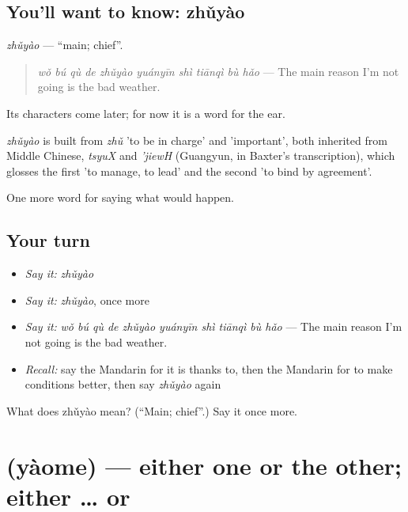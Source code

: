 \subsection*{You'll want to know: zhǔyào}
\emph{zhǔyào} — \textquotedblleft{}main; chief\textquotedblright{}.

\begin{quote}
\emph{wǒ bú qù de zhǔyào yuányīn shì tiānqì bù hǎo} — The main reason I'm not going is the bad weather.
\end{quote}

Its characters come later; for now it is a word for the ear.

\begin{cousinweb}
\emph{zhǔyào} is built from \emph{zhǔ} 'to be in charge' and  'important', both inherited from Middle Chinese, \emph{tsyuX} and \emph{'jiewH} (Guangyun, in Baxter's transcription), which glosses the first 'to manage, to lead' and the second 'to bind by agreement'.
\end{cousinweb}

\begin{grammarlens}[title={What you've built}]
One more word for saying what would happen.
\end{grammarlens}

\subsection*{Your turn}
\begin{itemize}
\raggedright
  \item \emph{Say it:} \emph{zhǔyào}
  \item \emph{Say it:} \emph{zhǔyào}, once more
  \item \emph{Say it:} \emph{wǒ bú qù de zhǔyào yuányīn shì tiānqì bù hǎo} — The main reason I'm not going is the bad weather.
  \item \emph{Recall:} say the Mandarin for it is thanks to, then the Mandarin for to make conditions better, then say \emph{zhǔyào} again
\end{itemize}

\begin{tcolorbox}[breakable,colback=teal!4,colframe=teal!35!black,title={Before you move on}]
What does zhǔyào mean? (\textquotedblleft{}Main; chief\textquotedblright{}.) Say it once more.
\end{tcolorbox}
\section[\texorpdfstring{\zh{要么} (yàome)}{要么 (yàome)}]{ (yàome) — either one or the other; either … or}

